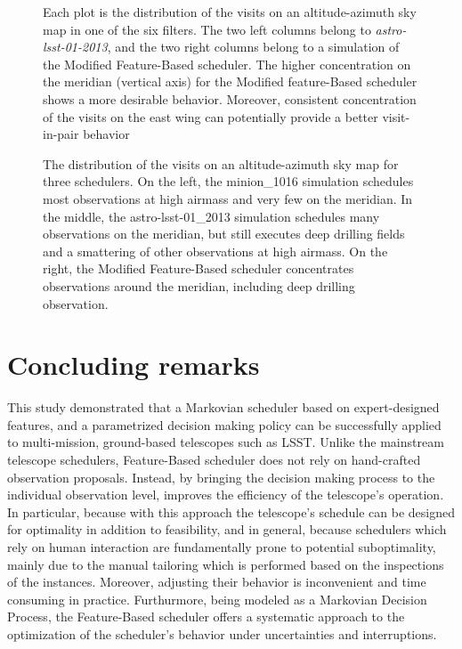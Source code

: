 \documentclass[12pt]{aastex62}
\theoremstyle{definition}
\begin{document}
\begin{figure}[h!]
\caption{Each plot is the distribution of the visits on an altitude-azimuth sky map in one of the six filters. The two left columns belong to \textit{astro-lsst-01-2013}, and the two right columns belong to a simulation of the Modified Feature-Based scheduler. The higher concentration on the meridian (vertical axis) for the Modified feature-Based scheduler shows a more desirable behavior. Moreover, consistent concentration of the visits on the east wing can potentially provide a better visit-in-pair behavior}
\label{fig_10yrs_AltAz}
\end{figure}


\begin{figure}
\caption{The distribution of the visits on an altitude-azimuth sky map for three schedulers. On the left, the minion\_1016 simulation schedules most observations at high airmass and very few on the meridian. In the middle, the astro-lsst-01\_2013 simulation schedules many observations on the meridian, but still executes deep drilling fields and a smattering of other observations at high airmass. On the right, the Modified Feature-Based scheduler concentrates observations around the meridian, including deep drilling observation. }\label{fig_all_alt_az}
\end{figure}

\section{Concluding remarks}\label{sec_conclusion}

This study demonstrated that a Markovian scheduler based on expert-designed features, and a parametrized decision making policy can be successfully applied to multi-mission, ground-based telescopes such as LSST. Unlike the mainstream telescope schedulers, Feature-Based scheduler does not rely on hand-crafted observation proposals. Instead, by bringing the decision making process to the individual observation level, improves the efficiency of the telescope's operation. In particular, because with this approach the telescope's schedule can be designed for optimality in addition to feasibility, and in general, because schedulers which rely on human interaction are fundamentally prone to potential suboptimality, mainly due to the manual tailoring which is performed based on the inspections of the instances. Moreover, adjusting their behavior is inconvenient and time consuming in practice. Furthurmore, being modeled as a Markovian Decision Process, the Feature-Based scheduler offers a systematic approach to the optimization of the scheduler's behavior under uncertainties and interruptions.
\end{document}
